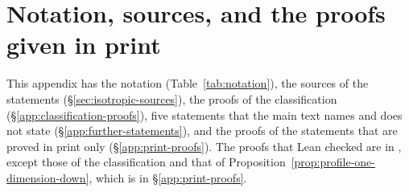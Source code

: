 \section{Notation, sources, and the proofs given in print}\label{app:isotropic-proofs}

This appendix has the notation (Table~\ref{tab:notation}), the sources of the statements
(\S\ref{sec:isotropic-sources}), the proofs of the classification
(\S\ref{app:classification-proofs}), five statements that the main text names and does not state
(\S\ref{app:further-statements}), and the proofs of the statements that are proved in print
only (\S\ref{app:print-proofs}). The proofs that Lean checked are in \suppl, except those of the
classification and that of Proposition~\ref{prop:profile-one-dimension-down}, which is in
\S\ref{app:print-proofs}.

